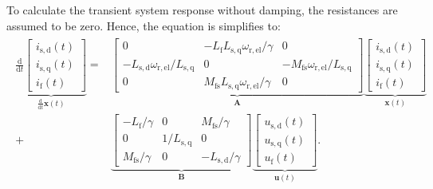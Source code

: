 \begin{solutionblock}
   To calculate the transient system response without damping, the resistances are assumed to be zero. Hence, the equation is simplifies to:
    \begin{align}
        \begin{split}
        \underbrace{
        \frac{\mathrm{d}}{\mathrm{d}t}
        \begin{bmatrix}
            i_{\mathrm{s,d}}(t) \\
            i_{\mathrm{s,q}}(t) \\
            i_{\mathrm{f}}(t)
        \end{bmatrix}}_{\frac{\mathrm{d}}{\mathrm{d}t}\bm{x}(t)}
        =
        &
        \underbrace{
        \begin{bmatrix}
            0   & -L_{\mathrm{f}}L_{\mathrm{s,q}}\omega_{\mathrm{r,el}}/ \gamma   & 0 \\
            -L_{\mathrm{s,d}}\omega_{\mathrm{r,el}}/ L_{\mathrm{s,q}} & 0 & -M_{\mathrm{fs}}\omega_{\mathrm{r,el}} / L_{\mathrm{s,q}} \\
            0 & M_{\mathrm{fs}}L_{\mathrm{s,q}}\omega_{\mathrm{r,el}} / \gamma & 0
        \end{bmatrix}}_{\bm{A}}
        \underbrace{
        \begin{bmatrix}
            i_{\mathrm{s,d}}(t) \\
            i_{\mathrm{s,q}}(t) \\
            i_{\mathrm{f}}(t)
        \end{bmatrix}}_{\bm{x}(t)}
        \\
        + &
        \underbrace{
        \begin{bmatrix}
            -L_{\mathrm{f}}/\gamma & 0 & M_{\mathrm{fs}}/\gamma \\
            0 & 1/L_{\mathrm{s,q}} & 0 \\
            M_{\mathrm{fs}}/\gamma & 0 & -L_{\mathrm{s,d}}/\gamma
        \end{bmatrix}}_{\bm{B}}
        \underbrace{
        \begin{bmatrix}
            u_{\mathrm{s,d}}(t) \\
            u_{\mathrm{s,q}}(t) \\
            u_{\mathrm{f}}(t)
        \end{bmatrix}}_{\bm{u}(t)}.
    \end{split}
    \end{align}


\end{solutionblock}
